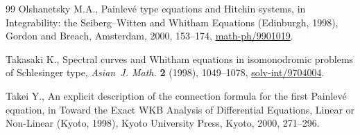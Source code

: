 \documentclass[11pt]{article}
\theoremstyle{definition}
\numberwithin{equation}{section}
\begin{document}
\begin{thebibliography}{99}
Olshanetsky M.A., Painlev\'e type equations and {H}itchin systems, in
  Integrability: the {S}eiberg--{W}itten and {W}hitham Equations ({E}dinburgh,
  1998), Gordon and Breach, Amsterdam, 2000, 153--174,
  \href{http://arxiv.org/abs/math-ph/9901019}{math-ph/9901019}.

Takasaki K., Spectral curves and {W}hitham equations in isomonodromic problems
  of {S}chlesinger type, \textit{Asian~J. Math.} \textbf{2} (1998), 1049--1078,
  \href{http://arxiv.org/abs/solv-int/9704004}{solv-int/9704004}.

Takei Y., An explicit description of the connection formula for the f\/irst
  {P}ainlev\'e equation, in Toward the Exact {WKB} Analysis of Dif\/ferential
  Equations, Linear or Non-Linear ({K}yoto, 1998), Kyoto University Press,
  Kyoto, 2000, 271--296.

\end{thebibliography}
\end{document}
